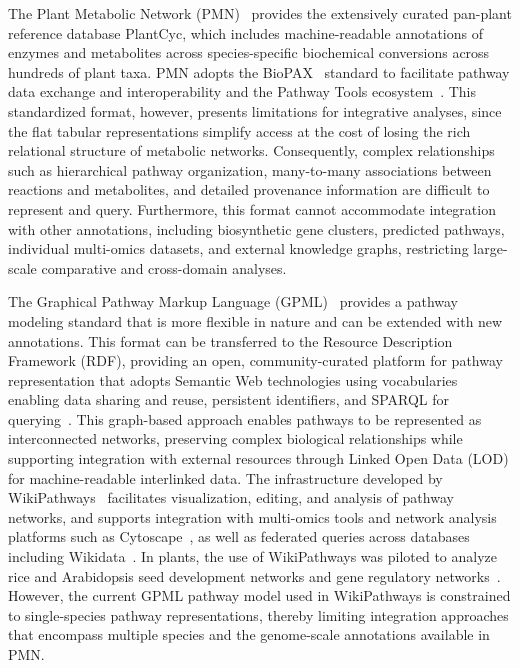 \documentclass[11pt,a4paper]{article}
\begin{document}
The Plant Metabolic Network (PMN)~\cite{hawkins2025} provides the extensively curated pan-plant
reference database PlantCyc, which includes machine-readable annotations of enzymes and metabolites
across species-specific biochemical conversions across hundreds of plant taxa. PMN adopts the
BioPAX~\cite{demir2010} standard to facilitate pathway data exchange and interoperability and the
Pathway Tools ecosystem~\cite{karp2021}. This standardized format, however, presents limitations for
integrative analyses, since the flat tabular representations simplify access at the cost of losing
the rich relational structure of metabolic networks. Consequently, complex relationships such as
hierarchical pathway organization, many-to-many associations between reactions and metabolites, and
detailed provenance information are difficult to represent and query. Furthermore, this format cannot
accommodate integration with other annotations, including biosynthetic gene clusters, predicted
pathways, individual multi-omics datasets, and external knowledge graphs, restricting large-scale
comparative and cross-domain analyses.

The Graphical Pathway Markup Language (GPML)~\cite{kutmon2015} provides a pathway modeling standard
that is more flexible in nature and can be extended with new annotations. This format can be
transferred to the Resource Description Framework (RDF), providing an open, community-curated
platform for pathway representation that adopts Semantic Web technologies using vocabularies enabling
data sharing and reuse, persistent identifiers, and SPARQL for querying~\cite{waagmeester2016}. This
graph-based approach enables pathways to be represented as interconnected networks, preserving
complex biological relationships while supporting integration with external resources through Linked
Open Data (LOD) for machine-readable interlinked data. The infrastructure developed by
WikiPathways~\cite{agrawal2024} facilitates visualization, editing, and analysis of pathway networks,
and supports integration with multi-omics tools and network analysis platforms such as
Cytoscape~\cite{shannon2003}, as well as federated queries across databases including
Wikidata~\cite{waagmeester2020}. In plants, the use of WikiPathways was piloted to analyze rice and
Arabidopsis seed development networks and gene regulatory networks~\cite{hanumappa2013}. However, the
current GPML pathway model used in WikiPathways is constrained to single-species pathway
representations, thereby limiting integration approaches that encompass multiple species and the
genome-scale annotations available in PMN.
\end{document}
